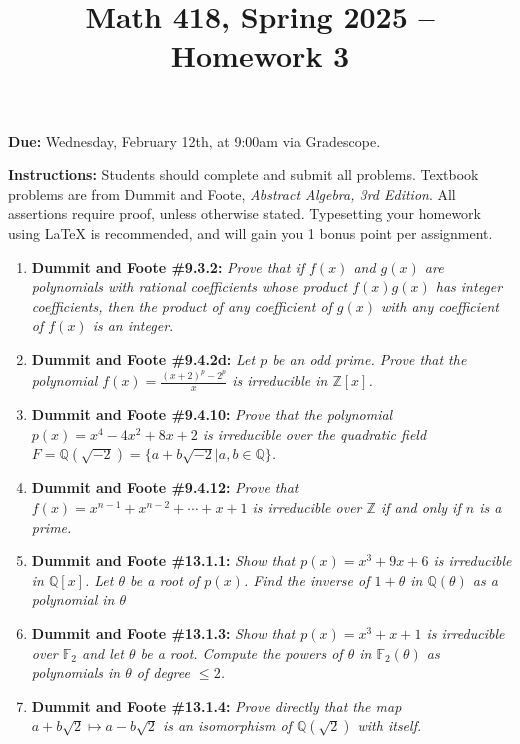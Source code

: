 \documentclass[12pt]{article}
\title{Math 418, Spring 2025 -- Homework 3}
\date{}
\newcommand{\Z}{\mathbb{Z}}
\newcommand{\Q}{\mathbb{Q}}
\newcommand{\F}{\mathbb{F}}
\begin{document}
 \maketitle
\vspace{-80pt}

\textbf{Due:} Wednesday, February 12th, at 9:00am via Gradescope.

\textbf{Instructions:} Students should complete and submit all problems. Textbook problems are from Dummit and Foote, \emph{Abstract Algebra, 3rd Edition}. All assertions require proof, unless otherwise stated. Typesetting your homework using LaTeX is recommended, and will gain you 1 bonus point per assignment.

\begin{enumerate}

\item[1.] \textbf{Dummit and Foote \#9.3.2:} \textit{Prove that if $f(x)$ and $g(x)$ are polynomials with rational coefficients whose product $f(x)g(x)$ has integer coefficients, then the product of any coefficient of $g(x)$ with any coefficient of $f(x)$ is an integer.}

\item[2.] \textbf{Dummit and Foote \#9.4.2d:} \textit{Let $p$ be an odd prime. Prove that the polynomial $f(x) = \frac{(x+2)^p - 2^p}{x}$ is irreducible in $\Z[x]$.}

\item[3.] \textbf{Dummit and Foote \#9.4.10:} \textit{Prove that the polynomial $p(x) = x^4 - 4x^2 + 8x + 2$ is irreducible over the quadratic field $F = \Q(\sqrt{-2}) = \{a + b\sqrt{-2} | a, b \in \Q\}$.}

\item[4.] \textbf{Dummit and Foote \#9.4.12:} \textit{Prove that $f(x) = x^{n-1} + x^{n-2} + \cdots + x + 1$ is irreducible over $\Z$ if and only if $n$ is a prime.}

\item[5.] \textbf{Dummit and Foote \#13.1.1:} \textit{Show that $p(x) = x^3 + 9x +6$ is irreducible in $\Q[x]$. Let $\theta$ be a root of $p(x)$. Find the inverse of $1+\theta$ in $\Q(\theta)$ as a polynomial in $\theta$}

\item[6.] \textbf{Dummit and Foote \#13.1.3:} \textit{Show that $p(x) = x^3+x+1$ is irreducible over $\F_2$ and let $\theta$ be a root. Compute the powers of $\theta$ in $\F_2(\theta)$ as polynomials in $\theta$ of degree $\le 2$.}

\item[7.] \textbf{Dummit and Foote \#13.1.4:} \textit{Prove directly that the map $a+b\sqrt{2}\mapsto a-b\sqrt{2}$ is an isomorphism of $\Q(\sqrt{2})$ with itself.}

\end{enumerate}
\end{document}
